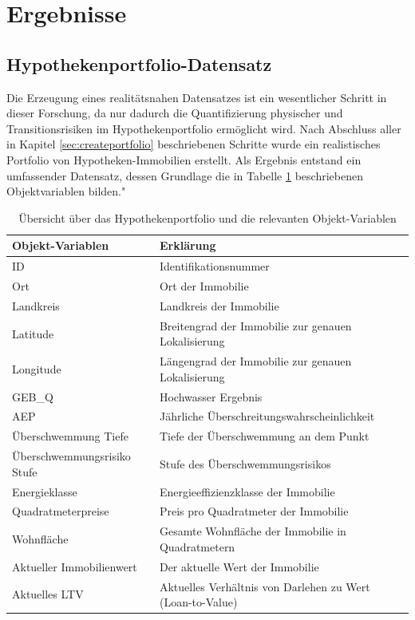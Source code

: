 \section{Ergebnisse}
\subsection{Hypothekenportfolio-Datensatz}
Die Erzeugung eines realitätsnahen Datensatzes ist ein wesentlicher Schritt in dieser Forschung, da nur dadurch die Quantifizierung physischer und Transitionsrisiken im Hypothekenportfolio ermöglicht wird. Nach Abschluss aller in Kapitel \ref{sec:createportfolio} beschriebenen Schritte wurde ein realistisches Portfolio von Hypotheken-Immobilien erstellt. Als Ergebnis entstand ein umfassender Datensatz, dessen Grundlage die in Tabelle \ref{tab:objekt-variablen} beschriebenen Objektvariablen bilden."
\begin{table}[htbp]
    \centering
    \small
    \caption{Übersicht über das Hypothekenportfolio und die relevanten Objekt-Variablen}
    \label{tab:objekt-variablen}
    \begin{tabularx}{1.0\textwidth}{>{\raggedright\arraybackslash}X >{\raggedright\arraybackslash}X}
        \toprule
        \textbf{Objekt-Variablen} & \textbf{Erklärung} \\
        \midrule
        ID & Identifikationsnummer \\
        \addlinespace
        Ort & Ort der Immobilie \\
        \addlinespace
        Landkreis & Landkreis der Immobilie \\
        \addlinespace
        Latitude & Breitengrad der Immobilie zur genauen Lokalisierung \\
        \addlinespace
        Longitude & Längengrad der Immobilie zur genauen Lokalisierung \\
        \addlinespace
        GEB\_Q & Hochwasser Ergebnis \\
        \addlinespace
        AEP & Jährliche Überschreitungswahrscheinlichkeit \\
        \addlinespace
        Überschwemmung Tiefe & Tiefe der Überschwemmung an dem Punkt \\
        \addlinespace
        Überschwemmungsrisiko Stufe & Stufe des Überschwemmungsrisikos \\
        \addlinespace
        Energieklasse & Energieeffizienzklasse der Immobilie \\
        \addlinespace
        Quadratmeterpreise & Preis pro Quadratmeter der Immobilie \\
        \addlinespace
        Wohnfläche & Gesamte Wohnfläche der Immobilie in Quadratmetern \\
        \addlinespace
        Aktueller Immobilienwert & Der aktuelle Wert der Immobilie \\
        \addlinespace        Aktuelles LTV & Aktuelles Verhältnis von Darlehen zu Wert (Loan-to-Value) \\
        \bottomrule
    \end{tabularx}
\end{table}

